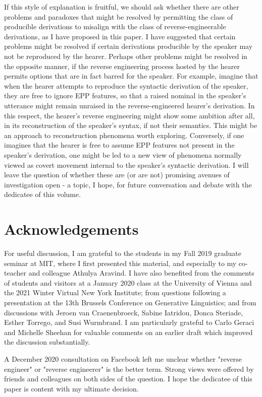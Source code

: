 \documentclass[output=paper]{langscibook}
\begin{document}
If this style of explanation is fruitful, we should ask whether there are other problems and paradoxes that might be resolved by permitting the class of producible derivations to misalign with the class of reverse-engineerable derivations, as I have proposed in this paper. I have suggested that certain problems might be resolved if certain derivations producible by the speaker may not be reproduced by the hearer. Perhaps other problems might be resolved in the opposite manner, if the reverse engineering process hosted by the hearer permits options that are in fact barred for the speaker. For example, imagine that when the hearer attempts to reproduce the syntactic derivation of the speaker, they are free to ignore EPP features, so that a raised nominal in the speaker's utterance might remain unraised in the reverse-engineered hearer's derivation. In this respect, the hearer's reverse engineering might show some ambition after all, in its reconstruction of the speaker's syntax, if not their semantics. This might be an approach to reconstruction phenomena worth exploring. Conversely, if one imagines that the hearer is free to assume EPP features not present in the speaker's derivation, one might be led to a new view of phenomena normally viewed as covert movement internal to the speaker's syntactic derivation. I will leave the question of whether these are (or are not) promising avenues of investigation open - a topic, I hope, for future conversation and debate with the dedicatee of this volume.


\section*{Acknowledgements}
For useful discussion, I am grateful to the students in my Fall 2019 graduate seminar at MIT, where I first presented this material, and especially to my co-teacher and colleague Athulya Aravind.  I have also benefited from the comments of students and visitors at a January 2020 class at the University of Vienna and the 2021 Winter Virtual New York Institute; from questions following a presentation at the 13th Brussels Conference on Generative Linguistics; and from discussions with Jeroen van Craenenbroeck, Sabine Iatridou, Donca Steriade, Esther Torrego, and Susi Wurmbrand. I am particularly grateful to Carlo Geraci and Michelle Sheehan for valuable comments on an earlier draft which improved the discussion substantially. 

A December 2020 consultation on Facebook left me unclear whether "reverse engineer" or "reverse engineerer" is the better term.  Strong views were offered by friends and colleagues on both sides of the question.  I hope the dedicatee of this paper is content with my ultimate decision.

\printbibliography[heading=subbibliography,notkeyword=this]
\end{document}
